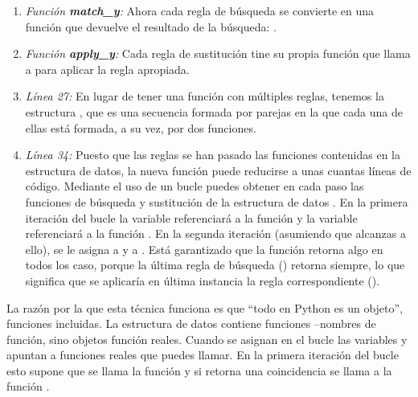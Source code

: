 \begin{enumerate}

\item \emph{Función \textbf{match\_y}:} Ahora cada regla de búsqueda se convierte en una  función que devuelve el resultado de la búsqueda: . 

\item \emph{Función \textbf{apply\_y}:} Cada regla de sustitución tine su propia función que llama a  para aplicar la regla apropiada.

\item \emph{Línea 27:} En lugar de tener una función  con múltiples reglas, tenemos la estructura , que es una secuencia formada por parejas en la que cada una de ellas está formada, a su vez, por dos funciones.

\item \emph{Línea 34:} Puesto que las reglas se han pasado las funciones contenidas en la estructura de datos, la nueva función  puede reducirse a unas cuantas líneas de código. Mediante el uso de un bucle  puedes obtener en cada paso las funciones de búsqueda y sustitución de la estructura de datos . En la primera iteración del bucle  la variable  referenciará a la función  y la variable  referenciará a la función . En la segunda iteración (asumiendo que alcanzas a ello), se le asigna  a  y  a . Está garantizado que la función retorna algo en todos los caso, porque la última regla de búsqueda () retorna  siempre, lo que significa que se aplicaría en última instancia la regla correspondiente ().

\end{enumerate}


La razón por la que esta técnica funciona es que ``todo en Python es un objeto'', funciones incluidas. La estructura de datos  contiene funciones --nombres de función, sino objetos función reales. Cuando se asignan en el bucle  las variables  y  apuntan a funciones reales que puedes llamar. En la primera iteración del bucle  esto supone que se llama la función  y si retorna una coincidencia se llama a la función .

